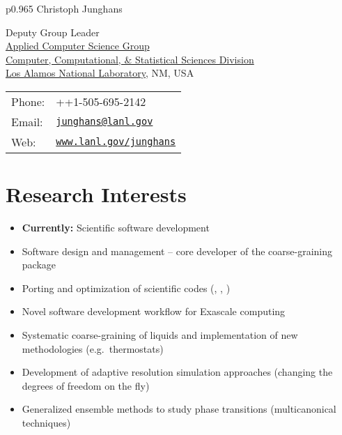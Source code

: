 \documentclass{article}
\begin{document}
\thispagestyle{plain}
\vspace*{-1.2cm}

\begin{tabular}{p{0.965\textwidth}}
{\huge Christoph Junghans}\\
\hline
\end{tabular}
\vspace{0.2in}

\begin{minipage}{0.55\linewidth}
  Deputy Group Leader\\ 
  \href{https://www.lanl.gov/org/ddste/aldsc/computer-computational-statistical-sciences/applied-computer-science/index.php}{Applied Computer Science Group}\\
  \href{https://www.lanl.gov/org/ddste/aldsc/computer-computational-statistical-sciences/index.php}{Computer, Computational, \& Statistical Sciences Division}\\
  \href{http://www.lanl.gov}{Los Alamos National Laboratory}, NM, USA
\end{minipage}
\begin{minipage}{0.45\linewidth}
  \begin{tabular}{ll}
    Phone: & ++1-505-695-2142 \\
    Email: & \href{mailto:junghans@lanl.gov}{\tt junghans@lanl.gov} \\
    Web: & \href{http://www.lanl.gov/junghans}{\tt www.lanl.gov/junghans} \\
  \end{tabular}
\end{minipage}

\section*{Research Interests}
\begin{itemize}
\setlength{\itemsep}{0pt}
\setlength{\parskip}{0pt}
\setlength{\parsep}{0pt}
\item \textbf{Currently:} Scientific software development 
\item Software design and management -- core developer of the coarse-graining package 
\item Porting and optimization of scientific codes (, , )
\item Novel software development workflow for Exascale computing
\item Systematic coarse-graining of liquids and implementation of new methodologies (e.g.\ thermostats)
\item Development of adaptive resolution simulation approaches (changing the degrees of freedom on the fly)
\item Generalized ensemble methods to study phase transitions (multicanonical techniques)
\end{itemize}
\end{document}
